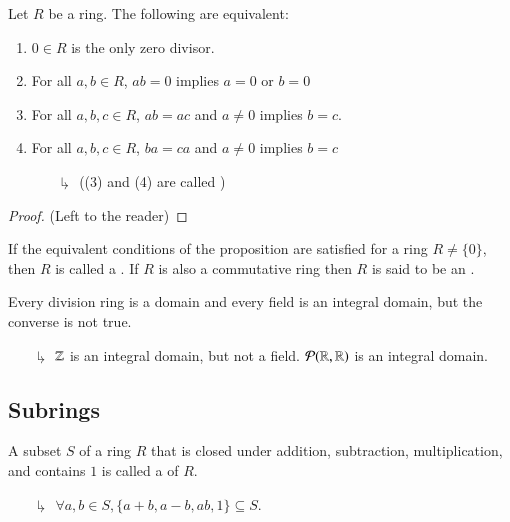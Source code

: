 \documentclass[12pt, a4paper, oneside, openright, titlepage]{book}
\begin{document}
\begin{prop}
    Let $R$ be a ring. The following are equivalent:
    \begin{enumerate}
        \item $0\in R$ is the only zero divisor.
        \item For all $a,b \in R$, $ab = 0$ implies $a = 0$ or $b = 0$
        \item For all $a,b,c \in R$, $ab = ac$ and $a \neq 0$ implies $b = c$.
        \item For all $a,b,c \in R$, $ba = ca$ and $a \neq 0$ implies $b = c$
        \begin{enumerate}
            \item[$\drsh$] ((3) and (4) are called )
        \end{enumerate}
    \end{enumerate}
    \begin{proof}
        (Left to the reader)
    \end{proof}
\end{prop}

\begin{defn}
    If the equivalent conditions of the proposition are satisfied for a ring $R \neq \{0\}$, then $R$ is called a . If $R$ is also a commutative ring then $R$ is said to be an .
\end{defn}

\begin{rmk}
    Every division ring is a domain and every field is an integral domain, but the converse is not true.
    \begin{enumerate}
        \item[$\drsh$] $\mathbb Z$ is an integral domain, but not a field. $\mathcal{P}(\mathbb R,\mathbb R)$ is an integral domain. 
    \end{enumerate}
\end{rmk}

\subsection{\textsection Subrings}

\begin{defn}
    A subset $S$ of a ring $R$ that is closed under addition, subtraction, multiplication, and contains $1$ is called a  of $R$.
    \begin{enumerate}
        \item[$\drsh$] $\forall a,b \in S, \{a+b,a-b,ab,1\} \subseteq S$.
    \end{enumerate}
\end{defn}
\end{document}
